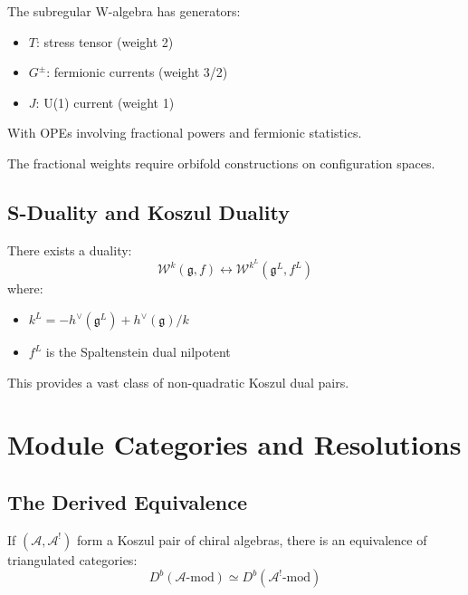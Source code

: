 \begin{theorem}
The subregular W-algebra has generators:
\begin{itemize}
\item $T$: stress tensor (weight 2)
\item $G^{\pm}$: fermionic currents (weight 3/2)
\item $J$: U(1) current (weight 1)
\end{itemize}
With OPEs involving fractional powers and fermionic statistics.
\end{theorem}

The fractional weights require orbifold constructions on configuration spaces.

\subsection{S-Duality and Koszul Duality}

\begin{theorem}
There exists a duality:
\[
\mathcal{W}^k(\mathfrak{g}, f) \longleftrightarrow \mathcal{W}^{k^L}(\mathfrak{g}^L, f^L)
\]
where:
\begin{itemize}
\item $k^L = -h^{\vee}(\mathfrak{g}^L) + h^{\vee}(\mathfrak{g})/k$
\item $f^L$ is the Spaltenstein dual nilpotent
\end{itemize}
\end{theorem}

This provides a vast class of non-quadratic Koszul dual pairs.


\section{Module Categories and Resolutions}

\subsection{The Derived Equivalence}

\begin{theorem}
If $(\mathcal{A}, \mathcal{A}^!)$ form a Koszul pair of chiral algebras, there is an equivalence of triangulated categories:
\[
D^b(\mathcal{A}\text{-mod}) \simeq D^b(\mathcal{A}^!\text{-mod})
\]
\end{theorem}

